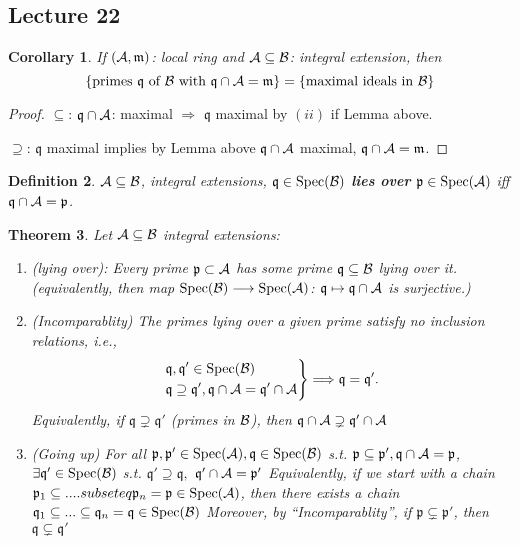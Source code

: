 \documentclass[11pt]{article}
\newtheorem{thm}{Theorem}[section]
\newtheorem{cor}[thm]{Corollary}
\newtheorem{dfn}[thm]{Definition}
\newcommand{\scm}{{\mathfrak m}}
\newcommand{\scp}{{\mathfrak p}}
\newcommand{\scq}{\mathfrak q}
\newcommand{\cala}{{\cal A}}
\newcommand{\calb}{{\cal B}}
\newcommand{\Lrta}{\Longrightarrow}
\newcommand{\lrta}{\longrightarrow}
\begin{document}
\subsection{Lecture 22}
\begin{cor}
If $(\cala,\scm)$: local ring and $\cala\subseteq \calb$: integral extension, then 
$$
\{\text{primes $\scq$ of $\calb$ with $\scq\cap\cala=\scm$}\}=\{\text{maximal ideals in $\calb$}\}
$$
\end{cor}
\begin{proof}
$\subseteq$: $\scq\cap \cala$: maximal $\Lrta$ $\scq$ maximal by $(ii)$ if Lemma above.

$\supseteq$: $\scq$ maximal implies by Lemma above $\scq\cap \cala$ maximal, $\scq\cap\cala=\scm$.
\end{proof}
\begin{dfn}
$\cala\subseteq \calb$, integral extensions, $\scq\in \text{Spec}(\calb)$ \textbf{lies over} $\scp\in \text{Spec}(\cala)$ iff $\scq\cap\cala=\scp$.
\end{dfn}
\begin{thm}\label{thm:integral_extension_primes_properties}
Let $\cala\subseteq \calb$ integral extensions:
\begin{enumerate}[label=(\roman*)]
\item (lying over): Every  prime $\scp\subset\cala$ has some prime $\scq\subseteq \calb$ lying over it. (equivalently, then map $\text{Spec}(\calb)\lrta \text{Spec}(\cala)$: $\scq\mapsto \scq\cap \cala$ is surjective.)

\item (Incomparablity) The primes lying over a given prime satisfy no inclusion relations, i.e.,
$$
\left.
\begin{aligned}
&\scq,\scq'\in \text{Spec}(\calb)\\
& \scq\supseteq\scq', \scq\cap\cala=\scq'\cap\cala
\end{aligned}
\right\}\Lrta \scq=\scq'.
$$
Equivalently, if $\scq\supsetneq \scq'$ (primes in $\calb$), then $\scq\cap\cala\supsetneq \scq'\cap\cala$
\item (Going up) For all $\scp,\scp'\in \text{Spec}(\cala),\scq\in \text{Spec}(\calb)$ s.t. $\scp\subseteq \scp',\scq\cap\cala=\scp$, \\
$\exists \scq'\in \text{Spec}(\calb)$ s.t. $\scq'\supseteq \scq,$ $\scq'\cap \cala=\scp'$
Equivalently, if we start with a chain 
$\scp_1\subseteq ....subseteq \scp_n=\scp\in \text{Spec}(\cala)$, then there exists a chain 
$\scq_1\subseteq ...\subseteq \scq_n=\scq\in \text{Spec}(\calb)$ 
Moreover, by ``Incomparablity'', if $\scp\subsetneq \scp'$, then $\scq\subsetneq \scq'$
\end{enumerate}
\end{thm}
\end{document}
